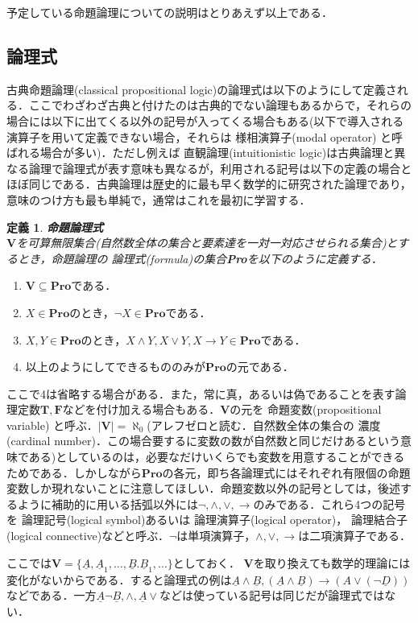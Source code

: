 \documentclass{ltjsarticle}
\theoremstyle{mystyle1}
\newtheorem{dfn}{定義}[part]
\theoremstyle{mystyle2}
\newcommand{\uA}{\underline{A}}
\newcommand{\uB}{\underline{B}}
\newcommand{\uD}{\underline{D}}
\newcommand{\bT}{\ensuremath{\mathbf{T}}}
\newcommand{\bF}{\ensuremath{\mathbf{F}}}
\newcommand{\bV}{\ensuremath{\mathbf{V}}}
\newcommand{\bPro}{\ensuremath{\mathbf{Pro}}}
\newcommand{\red}[1]{{\color{red} #1}}
\begin{document}
予定している命題論理についての説明はとりあえず以上である．
\subsection{論理式}
古典命題論理(classical propositional logic)の論理式は以下のようにして定義される．ここでわざわざ古典と付けたのは古典的でない論理もあるからで，それらの場合には以下に出てくる以外の記号が入ってくる場合もある(以下で導入される演算子を用いて定義できない場合，それらは\red{様相演算子}(modal operator) と呼ばれる場合が多い)．ただし例えば\red{直観論理}(intuitionistic logic)は古典論理と異なる論理で論理式が表す意味も異なるが，利用される記号は以下の定義の場合とほぼ同じである．古典論理は歴史的に最も早く数学的に研究された論理であり，意味のつけ方も最も単純で，通常はこれを最初に学習する．
\begin{dfn}\label{dfn:formula}
  \textbf{命題論理式}\\$\bV$を可算無限集合(自然数全体の集合と要素達を一対一対応させられる集合)とするとき，命題論理の\red{論理式}(formula)の集合\textbf{Pro}を以下のように定義する．
\end{dfn}
\begin{enumerate}
  \item $\bV\subseteq\bPro$である．
  \item $X\in\bPro$のとき，$\neg X\in\bPro$である．
  \item $X,Y\in\bPro$のとき，$X\wedge Y,X\vee Y,X\to Y\in\bPro$である．
  \item 以上のようにしてできるもののみが$\bPro$の元である．
\end{enumerate}
ここで4は省略する場合がある．また，常に真，あるいは偽であることを表す論理定数$\bT,\bF$などを付け加える場合もある．$\bV$の元を\red{命題変数}(propositional variable) と呼ぶ．$|\bV|= \aleph_0$(アレフゼロと読む．自然数全体の集合の\red{濃度}(cardinal number)．この場合要するに変数の数が自然数と同じだけあるという意味である)としているのは，必要なだけいくらでも変数を用意することができるためである．しかしながら$\bPro$の各元，即ち各論理式にはそれぞれ有限個の命題変数しか現れないことに注意してほしい．命題変数以外の記号としては，後述するように補助的に用いる括弧以外には$\neg,\wedge,\vee,\to$のみである．これら4つの記号を\red{論理記号}(logical symbol)あるいは\red{論理演算子}(logical operator)，\red{論理結合子}(logical connective)などと呼ぶ．$\neg$は単項演算子，$\wedge,\vee,\to$は二項演算子である．

ここでは$\bV = \{\uA, \uA_1, \ldots, \uB. \uB_1, \ldots\}$としておく． $\bV$を取り換えても数学的理論には変化がないからである．すると論理式の例は$\uA\wedge\uB, \left(\uA\wedge\uB\right) \to \left(A\vee\left(\neg \uD\right)\right)$などである．一方$\uA\neg\uB, \wedge, \uA\vee$などは使っている記号は同じだが論理式ではない．
\end{document}
